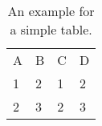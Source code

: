\begin{table}[htpb]
	\caption[Example table]{An example for a simple table.}\label{tab:sampleA}
	\centering
	\begin{tabular}{l l l l}
		A & B & C & D \\
		\cline{1-4}	
		1 & 2 & 1 & 2 \\
		2 & 3 & 2 & 3 \\
	\end{tabular}
\end{table}



